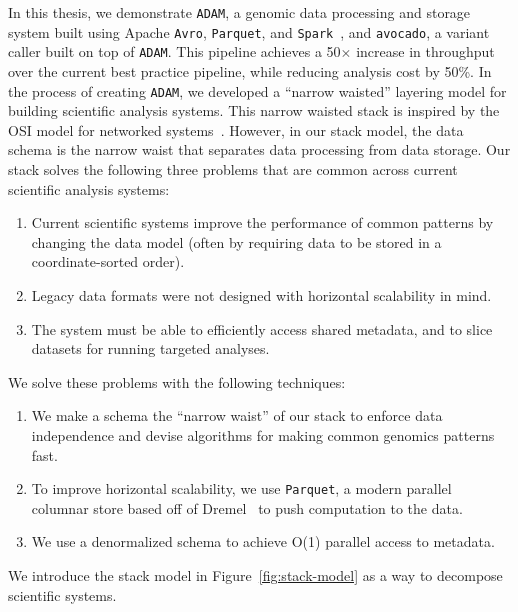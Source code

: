 \documentclass[masters]{ucbthesis}
\begin{document}
In this thesis, we demonstrate \texttt{ADAM}, a genomic data processing and storage system built using
Apache \texttt{Avro}, \texttt{Parquet}, and \texttt{Spark}~\cite{avro, parquet, zaharia10}, and \texttt{avocado}, a variant caller
built on top of \texttt{ADAM}. This pipeline achieves a 50$\times$ increase in throughput over the current
best practice pipeline, while reducing analysis cost by 50\%. In the process of creating \texttt{ADAM},
we developed a ``narrow waisted'' layering model for building scientific analysis systems. This narrow
waisted stack is inspired by the OSI model for networked systems~\cite{zimmermann80}. However, in our
stack model, the data schema is the narrow waist that separates data processing from data storage. Our
stack solves the following three problems that are common across current scientific analysis systems:

\begin{enumerate}
\item Current scientific systems improve the performance of common patterns by changing the data
model (often by requiring data to be stored in a coordinate-sorted order).
\item Legacy data formats were not designed with horizontal scalability in mind.
\item The system must be able to efficiently access shared metadata, and to slice datasets for running
targeted analyses.
\end{enumerate}

We solve these problems with the following techniques:

\begin{enumerate}
\item We make a schema the ``narrow waist'' of our stack to enforce data independence and
devise algorithms for making common genomics patterns fast.
\item To improve horizontal scalability, we use \texttt{Parquet}, a modern parallel columnar store based off of
Dremel~\cite{melnik10} to push computation to the data.
\item We use a denormalized schema to achieve O(1) parallel access to metadata.
\end{enumerate}

We introduce the stack model in Figure~\ref{fig:stack-model} as a way to decompose scientific systems.
\end{document}
